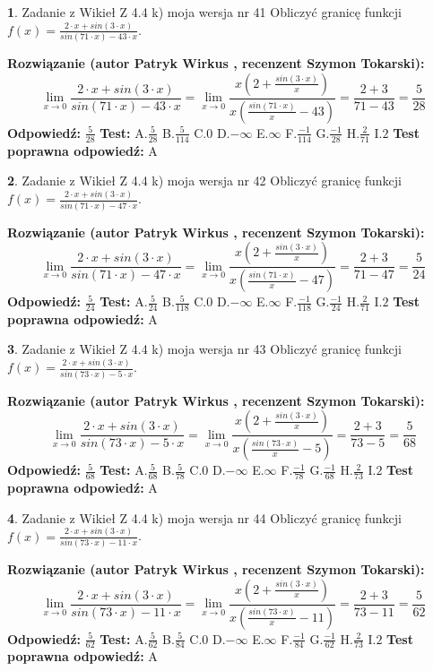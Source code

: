 \documentclass[12pt, a4paper]{article}
\theoremstyle{definition} %
\newtheorem{zad}{}
\newcommand{\zadStart}[1]{\begin{zad}#1\newline}
\newcommand{\zadStop}{\end{zad}}
\newcommand{\rozwStart}[2]{\noindent \textbf{Rozwiązanie (autor #1 , recenzent #2): }\newline}
\newcommand{\rozwStop}{\newline}
\newcommand{\odpStart}{\noindent \textbf{Odpowiedź:}\newline}
\newcommand{\odpStop}{\newline}
\newcommand{\testStart}{\noindent \textbf{Test:}\newline}
\newcommand{\testStop}{\newline}
\newcommand{\kluczStart}{\noindent \textbf{Test poprawna odpowiedź:}\newline}
\newcommand{\kluczStop}{\newline}
\begin{document}
\zadStart{Zadanie z Wikieł Z 4.4 k) moja wersja nr 41}
Obliczyć granicę funkcji $f(x)=\frac{2\cdot x +sin(3\cdot x)}{sin(71\cdot x) -43\cdot x}$.
\zadStop
\rozwStart{Patryk Wirkus}{Szymon Tokarski}
$$\lim\limits_{x\to 0}\frac{2\cdot x +sin(3\cdot x)}{sin(71\cdot x) -43\cdot x}
=\lim\limits_{x\to 0}\frac{x(2+\frac{sin(3\cdot x)}{x})}{x(\frac{sin(71\cdot x)}{x}-43)}
=\frac{2+3}{71-43} = \frac{5}{28}$$
\rozwStop
\odpStart
$\frac{5}{28}$
\odpStop
\testStart
A.$\frac{5}{28}$
B.$\frac{5}{114}$
C.$0$
D.$-\infty$
E.$\infty$
F.$\frac{-1}{114}$
G.$\frac{-1}{28}$
H.$\frac{2}{71}$
I.$2$
\testStop
\kluczStart
A
\kluczStop



\zadStart{Zadanie z Wikieł Z 4.4 k) moja wersja nr 42}
Obliczyć granicę funkcji $f(x)=\frac{2\cdot x +sin(3\cdot x)}{sin(71\cdot x) -47\cdot x}$.
\zadStop
\rozwStart{Patryk Wirkus}{Szymon Tokarski}
$$\lim\limits_{x\to 0}\frac{2\cdot x +sin(3\cdot x)}{sin(71\cdot x) -47\cdot x}
=\lim\limits_{x\to 0}\frac{x(2+\frac{sin(3\cdot x)}{x})}{x(\frac{sin(71\cdot x)}{x}-47)}
=\frac{2+3}{71-47} = \frac{5}{24}$$
\rozwStop
\odpStart
$\frac{5}{24}$
\odpStop
\testStart
A.$\frac{5}{24}$
B.$\frac{5}{118}$
C.$0$
D.$-\infty$
E.$\infty$
F.$\frac{-1}{118}$
G.$\frac{-1}{24}$
H.$\frac{2}{71}$
I.$2$
\testStop
\kluczStart
A
\kluczStop



\zadStart{Zadanie z Wikieł Z 4.4 k) moja wersja nr 43}
Obliczyć granicę funkcji $f(x)=\frac{2\cdot x +sin(3\cdot x)}{sin(73\cdot x) -5\cdot x}$.
\zadStop
\rozwStart{Patryk Wirkus}{Szymon Tokarski}
$$\lim\limits_{x\to 0}\frac{2\cdot x +sin(3\cdot x)}{sin(73\cdot x) -5\cdot x}
=\lim\limits_{x\to 0}\frac{x(2+\frac{sin(3\cdot x)}{x})}{x(\frac{sin(73\cdot x)}{x}-5)}
=\frac{2+3}{73-5} = \frac{5}{68}$$
\rozwStop
\odpStart
$\frac{5}{68}$
\odpStop
\testStart
A.$\frac{5}{68}$
B.$\frac{5}{78}$
C.$0$
D.$-\infty$
E.$\infty$
F.$\frac{-1}{78}$
G.$\frac{-1}{68}$
H.$\frac{2}{73}$
I.$2$
\testStop
\kluczStart
A
\kluczStop



\zadStart{Zadanie z Wikieł Z 4.4 k) moja wersja nr 44}
Obliczyć granicę funkcji $f(x)=\frac{2\cdot x +sin(3\cdot x)}{sin(73\cdot x) -11\cdot x}$.
\zadStop
\rozwStart{Patryk Wirkus}{Szymon Tokarski}
$$\lim\limits_{x\to 0}\frac{2\cdot x +sin(3\cdot x)}{sin(73\cdot x) -11\cdot x}
=\lim\limits_{x\to 0}\frac{x(2+\frac{sin(3\cdot x)}{x})}{x(\frac{sin(73\cdot x)}{x}-11)}
=\frac{2+3}{73-11} = \frac{5}{62}$$
\rozwStop
\odpStart
$\frac{5}{62}$
\odpStop
\testStart
A.$\frac{5}{62}$
B.$\frac{5}{84}$
C.$0$
D.$-\infty$
E.$\infty$
F.$\frac{-1}{84}$
G.$\frac{-1}{62}$
H.$\frac{2}{73}$
I.$2$
\testStop
\kluczStart
A
\kluczStop
\end{document}
